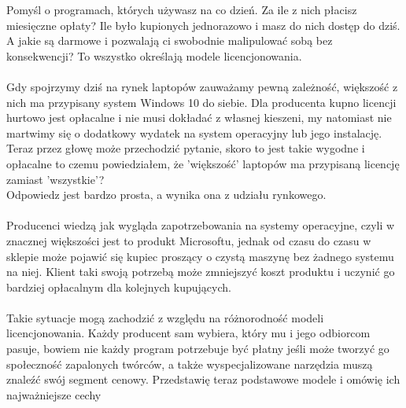 \documentclass[10pt,a4paper]{report}
\begin{document}
Pomyśl o programach, których używasz na co dzień. Za ile z nich płacisz miesięczne opłaty? Ile było kupionych jednorazowo i masz do nich dostęp do dziś. A jakie są darmowe i pozwalają ci swobodnie malipulować sobą bez konsekwencji? To wszystko określają modele licencjonowania.\\\\Gdy spojrzymy dziś na rynek laptopów zauważamy pewną zależność, większość z nich ma przypisany system Windows 10 do siebie. Dla producenta kupno licencji hurtowo jest opłacalne i nie musi dokładać z własnej kieszeni, my natomiast nie martwimy się o dodatkowy wydatek na system operacyjny lub jego instalację.\\Teraz przez głowę może przechodzić pytanie, skoro to jest takie wygodne i opłacalne to czemu powiedziałem, że 'większość' laptopów ma przypisaną licencję zamiast 'wszystkie'? \\Odpowiedz jest bardzo prosta, a wynika ona z udziału rynkowego.\\\\ Producenci wiedzą jak wygląda zapotrzebowania na systemy operacyjne, czyli w znacznej większości jest to produkt Microsoftu, jednak od czasu do czasu w sklepie może pojawić się kupiec proszący o czystą maszynę bez żadnego systemu na niej. Klient taki swoją potrzebą może zmniejszyć koszt produktu i uczynić go bardziej opłacalnym dla kolejnych kupujących.\\\\ Takie sytuacje mogą zachodzić z względu na różnorodność modeli licencjonowania. Każdy producent sam wybiera, który mu i jego odbiorcom pasuje, bowiem nie każdy program potrzebuje być płatny jeśli może tworzyć go społeczność zapalonych twórców, a także wyspecjalizowane narzędzia muszą znaleźć swój segment cenowy. Przedstawię teraz podstawowe modele i omówię ich najważniejsze cechy
\end{document}
